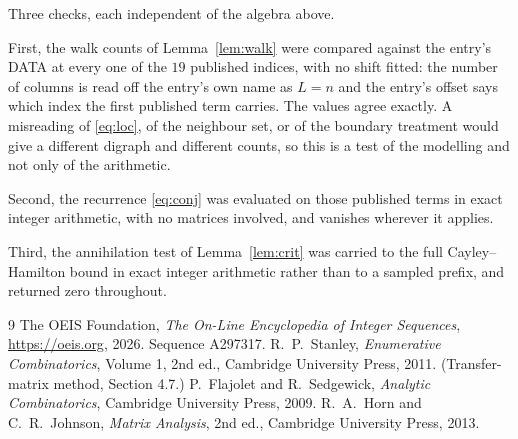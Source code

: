 \documentclass[11pt,a4paper]{article}
\theoremstyle{plain}
\theoremstyle{definition}
\begin{document}
Three checks, each independent of the algebra above.

First, the walk counts of Lemma~\ref{lem:walk} were compared against the entry's DATA at
every one of the $19$ published indices, with no shift fitted: the number of columns is
read off the entry's own name as $L=n$ and the entry's offset says which index the first
published term carries. The values agree exactly. A misreading of \eqref{eq:loc}, of the
neighbour set, or of the boundary treatment would give a different digraph and different
counts, so this is a test of the modelling and not only of the arithmetic.

Second, the recurrence \eqref{eq:conj} was evaluated on those published terms in exact
integer arithmetic, with no matrices involved, and vanishes wherever it applies.

Third, the annihilation test of Lemma~\ref{lem:crit} was carried to the full
Cayley--Hamilton bound in exact integer arithmetic rather than to a sampled prefix, and
returned zero throughout.

\begin{thebibliography}{9}
 The OEIS Foundation, \emph{The On-Line Encyclopedia of Integer
Sequences}, \url{https://oeis.org}, 2026. Sequence A297317.
 R.~P.~Stanley, \emph{Enumerative Combinatorics}, Volume 1, 2nd ed.,
Cambridge University Press, 2011. (Transfer-matrix method, Section 4.7.)
 P.~Flajolet and R.~Sedgewick, \emph{Analytic Combinatorics}, Cambridge
University Press, 2009.
 R.~A.~Horn and C.~R.~Johnson, \emph{Matrix Analysis}, 2nd ed., Cambridge
University Press, 2013.
\end{thebibliography}
\end{document}
